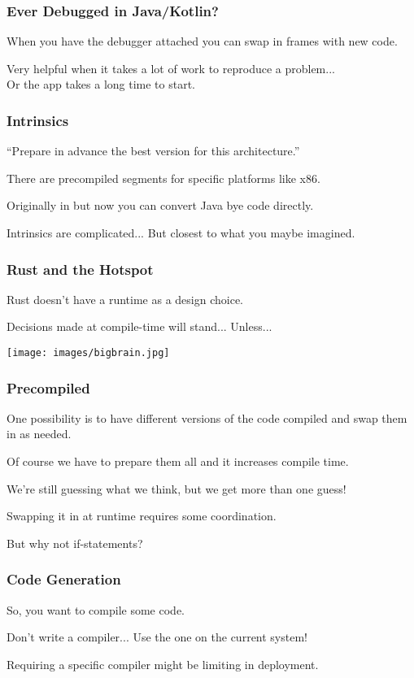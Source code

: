 \begin{frame}
\frametitle{Ever Debugged in Java/Kotlin?}

When you have the debugger attached you can swap in frames with new code.

Very helpful when it takes a lot of work to reproduce a problem...\\
\quad Or the app takes a long time to start.

\end{frame}


\begin{frame}
\frametitle{Intrinsics}

``Prepare in advance the best version for this architecture.''

There are precompiled segments for specific platforms like x86.

Originally in \CPP but now you can convert Java bye code directly. 

Intrinsics are complicated... But closest to what you maybe imagined.

\end{frame}


\begin{frame}
\frametitle{Rust and the Hotspot}

Rust doesn't have a runtime as a design choice.

Decisions made at compile-time will stand... Unless...

\begin{center}
	\texttt{[image: images/bigbrain.jpg]}
\end{center}

\end{frame}


\begin{frame}
\frametitle{Precompiled}

One possibility is to have different versions of the code compiled and swap them in as needed.

Of course we have to prepare them all and it increases compile time.

We're still guessing what we think, but we get more than one guess!

Swapping it in at runtime requires some coordination.

But why not if-statements?

\end{frame}

\begin{frame}
\frametitle{Code Generation}

So, you want to compile some code. 

Don't write a compiler... Use the one on the current system!

Requiring a specific compiler might be limiting in deployment.

\end{frame}


